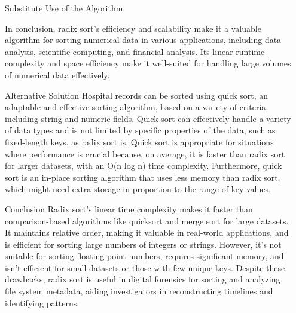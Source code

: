 \documentclass[final]{beamer}
\newlength{\sepwidth}
\newlength{\colwidth}
\newcommand{\separatorcolumn}{\begin{column}{\sepwidth}\end{column}}
\begin{document}
\begin{frame}[t]
\begin{columns}[t]
\begin{column}{\colwidth}
\begin{alertblock}{Substitute Use of the Algorithm}{}
            
            In conclusion, radix sort's efficiency and scalability make it a valuable algorithm for sorting numerical data in various applications, including data analysis, scientific computing, and financial analysis. Its linear runtime complexity and space efficiency make it well-suited for handling large volumes of numerical data effectively.
            
            
                        
            			\end{alertblock}
   
   		\begin{alertblock}{Alternative Solution}
			\justifying
    Hospital records can be sorted using quick sort, an adaptable and effective sorting algorithm, based on a variety of criteria, including string and numeric fields. Quick sort can effectively handle a variety of data types and is not limited by specific properties of the data, such as fixed-length keys, as radix sort is. Quick sort is appropriate for situations where performance is crucial because, on average, it is faster than radix sort for larger datasets, with an O(n log n) time complexity. Furthermore, quick sort is an in-place sorting algorithm that uses less memory than radix sort, which might need extra storage in proportion to the range of key values.


             
			\end{alertblock}
   
			\begin{alertblock}{Conclusion}
			\justifying
             Radix sort's linear time complexity makes it faster than comparison-based algorithms like quicksort and merge sort for large datasets. It maintains relative order, making it valuable in real-world applications, and is efficient for sorting large numbers of integers or strings. However, it's not suitable for sorting floating-point numbers, requires significant memory, and isn't efficient for small datasets or those with few unique keys. Despite these drawbacks, radix sort is useful in digital forensics for sorting and analyzing file system metadata, aiding investigators in reconstructing timelines and identifying patterns.


             
			\end{alertblock}
		\end{column}
		
		\separatorcolumn
	\end{columns}
    \end{frame}
\end{document}
